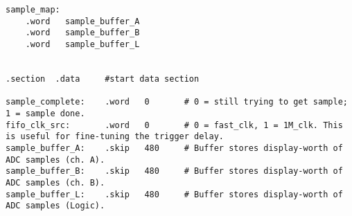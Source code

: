 \begin{lstlisting}
sample_map:
	.word	sample_buffer_A
	.word	sample_buffer_B
	.word	sample_buffer_L


.section  .data     #start data section

sample_complete:	.word	0		# 0 = still trying to get sample; 1 = sample done.
fifo_clk_src:		.word	0		# 0 = fast_clk, 1 = 1M_clk. This is useful for fine-tuning the trigger delay.
sample_buffer_A:	.skip	480		# Buffer stores display-worth of ADC samples (ch. A).
sample_buffer_B:	.skip	480		# Buffer stores display-worth of ADC samples (ch. B).
sample_buffer_L:	.skip	480		# Buffer stores display-worth of ADC samples (Logic).
\end{lstlisting}


